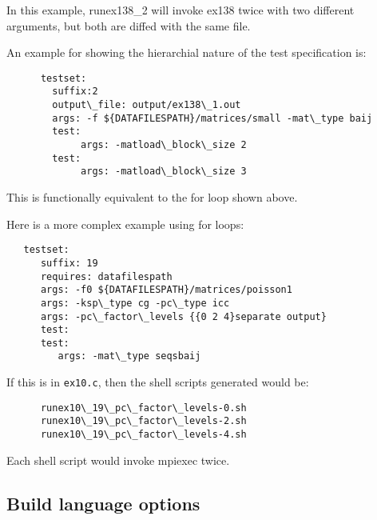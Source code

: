 In this example, runex138\_2 will invoke ex138 twice with two different
arguments, but both are diffed with the same file.

An example for showing the hierarchial nature of the test specification is:
%
\begin{lstlisting}
      testset: 
        suffix:2
        output\_file: output/ex138\_1.out
        args: -f ${DATAFILESPATH}/matrices/small -mat\_type baij
        test:
             args: -matload\_block\_size 2
        test:
             args: -matload\_block\_size 3
\end{lstlisting}
This is functionally equivalent to the for loop shown above.

Here is a more complex example using for loops:
\begin{lstlisting}
   testset:
      suffix: 19
      requires: datafilespath
      args: -f0 ${DATAFILESPATH}/matrices/poisson1
      args: -ksp\_type cg -pc\_type icc 
      args: -pc\_factor\_levels {{0 2 4}separate output}
      test:
      test:
         args: -mat\_type seqsbaij
\end{lstlisting}
If this is in \lstinline{ex10.c}, then the shell scripts generated would
be:
\begin{lstlisting}
      runex10\_19\_pc\_factor\_levels-0.sh
      runex10\_19\_pc\_factor\_levels-2.sh
      runex10\_19\_pc\_factor\_levels-4.sh
\end{lstlisting}
Each shell script would invoke mpiexec twice.
 
\subsection{Build language options%
  \label{build-language-options}%
}

